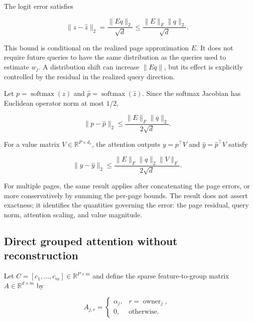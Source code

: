 \documentclass{article} %
\begin{document}
The logit error satisfies

\begin{equation}
    \|z-\widehat z\|_2
    =\frac{\|Eq\|_2}{\sqrt d}
    \leq\frac{\|E\|_F\|q\|_2}{\sqrt d}.
    \label{eq:app-logit-bound}
\end{equation}

This bound is conditional on the realized page approximation $E$. It does not
require future queries to have the same distribution as the queries used to
estimate $w_j$. A distribution shift can increase $\|Eq\|$, but its effect is
explicitly controlled by the residual in the realized query direction.

Let $p=\operatorname{softmax}(z)$ and
$\widehat p=\operatorname{softmax}(\widehat z)$. Since the softmax Jacobian
has Euclidean operator norm at most $1/2$,

\begin{equation}
    \|p-\widehat p\|_2
    \leq\frac{\|E\|_F\|q\|_2}{2\sqrt d}.
    \label{eq:app-softmax-bound}
\end{equation}

For a value matrix $V\in\mathbb{R}^{P\times d_v}$, the attention outputs
$y=p^{\top}V$ and $\widehat y=\widehat p^{\top}V$ satisfy

\begin{equation}
    \|y-\widehat y\|_2
    \leq\frac{\|E\|_F\|q\|_2\|V\|_F}{2\sqrt d}.
    \label{eq:app-output-bound}
\end{equation}

For multiple pages, the same result applies after concatenating the page
errors, or more conservatively by summing the per-page bounds. The result
does not assert exactness; it identifies the quantities governing the error:
the page residual, query norm, attention scaling, and value magnitude.

\subsection{Direct grouped attention without reconstruction}
\label{app:direct-attention}

Let $C=[c_1,\ldots,c_m]\in\mathbb{R}^{P\times m}$ and define the sparse
feature-to-group matrix $A\in\mathbb{R}^{d\times m}$ by

\begin{equation}
    A_{j,r}=\begin{cases}
        \alpha_j,& r=\operatorname{owner}_j,\\
        0,&\text{otherwise.}
    \end{cases}
\end{equation}
\end{document}
